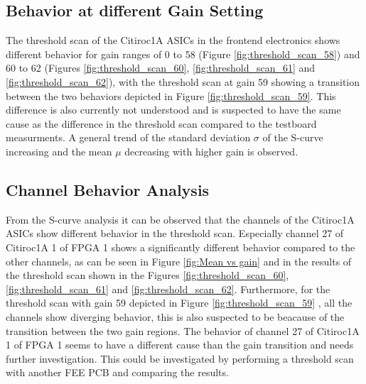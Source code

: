 \subsection{Behavior at different Gain Setting}
The threshold scan of the Citiroc1A ASICs in the frontend electronics shows different behavior for gain ranges of 0 to 58 (Figure \ref{fig:threshold_scan_58}) and 60 to 62 (Figures \ref{fig:threshold_scan_60}, \ref{fig:threshold_scan_61} and \ref{fig:threshold_scan_62}),
with the threshold scan at gain 59 showing a transition between the two behaviors depicted in Figure \ref{fig:threshold_scan_59}.
This difference is also currently not understood and is suspected to have the same cause as the difference in the threshold scan compared to the testboard measurments. 
\newline
A general trend of the standard deviation $\sigma$ of the S-curve increasing and the mean $\mu$ decreasing with higher gain is observed.
\subsection{Channel Behavior Analysis}
From the S-curve analysis it can be observed that the channels of the Citiroc1A ASICs show different behavior in the threshold scan.
\newline
Especially channel 27 of Citiroc1A 1 of FPGA 1 shows a significantly different behavior compared to the other channels,
as can be seen in Figure \ref{fig:Mean vs gain} and in the results of the threshold scan shown in the Figures \ref{fig:threshold_scan_60}, \ref{fig:threshold_scan_61} and \ref{fig:threshold_scan_62}.
\newline
Furthermore, for the threshold scan with gain 59 depicted in Figure \ref{fig:threshold_scan_59} , all the channels show diverging behavior, this is also suspected to be beacause of the transition between the two gain regions.
\newline
The behavior of channel 27 of Citiroc1A 1 of FPGA 1 seems to have a different cause than the gain transition and needs further investigation.
This could be investigated by performing a threshold scan with another FEE PCB and comparing the results.

